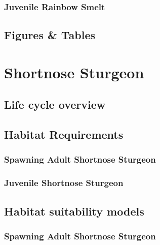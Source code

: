 \documentclass[
]{book}
\begin{document}
\hypertarget{juvenile-rainbow-smelt-1}{%
\subsection{Juvenile Rainbow Smelt}\label{juvenile-rainbow-smelt-1}}

\hypertarget{figures-tables-7}{%
\section{Figures \& Tables}\label{figures-tables-7}}

\hypertarget{shortnose-sturgeon}{%
\chapter{Shortnose Sturgeon}\label{shortnose-sturgeon}}

\hypertarget{life-cycle-overview-8}{%
\section{Life cycle overview}\label{life-cycle-overview-8}}

\hypertarget{habitat-requirements-8}{%
\section{Habitat Requirements}\label{habitat-requirements-8}}

\hypertarget{spawning-adult-shortnose-sturgeon}{%
\subsection{Spawning Adult Shortnose Sturgeon}\label{spawning-adult-shortnose-sturgeon}}

\hypertarget{juvenile-shortnose-sturgeon}{%
\subsection{Juvenile Shortnose Sturgeon}\label{juvenile-shortnose-sturgeon}}

\hypertarget{habitat-suitability-models-8}{%
\section{Habitat suitability models}\label{habitat-suitability-models-8}}

\hypertarget{spawning-adult-shortnose-sturgeon-1}{%
\subsection{Spawning Adult Shortnose Sturgeon}\label{spawning-adult-shortnose-sturgeon-1}}
\end{document}
